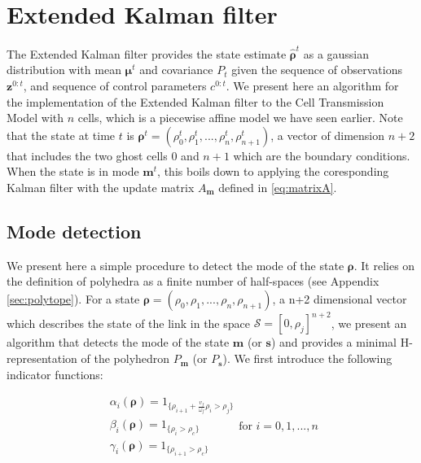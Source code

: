 \documentclass[11pt]{article}
\numberwithin{equation}{section}
\numberwithin{figure}{section}
\numberwithin{table}{section}
\begin{document}
\section{Extended Kalman filter}

The Extended Kalman filter provides the state estimate $\hat{\boldsymbol\rho}^{t}$ as a gaussian distribution with mean $\boldsymbol\mu^{t}$ and covariance $P_{t}$ given the sequence of observations $\boldsymbol z^{0:t}$, and sequence of control parameters $c^{0:t}$. We present here an algorithm for the implementation of the Extended Kalman filter to the Cell Transmission Model with $n$ cells, which is a piecewise affine model we have seen earlier. Note that the state at time $t$ is $\boldsymbol\rho^{t} = (\rho^{t}_{0},\rho^{t}_{1},...,\rho^{t}_{n},\rho^{t}_{n+1})$, a vector of dimension $n+2$ that includes the two ghost cells $0$ and $n+1$ which are the boundary conditions. When the state is in mode $\boldsymbol m^{t}$, this boils down to applying the coresponding Kalman filter with the update matrix $A_{\boldsymbol m}$ defined in \ref{eq:matrixA}.


\subsection{Mode detection}

We present here a simple procedure to detect the mode of the state $\boldsymbol\rho$. It relies on the definition of polyhedra as a finite number of half-spaces (see Appendix \ref{sec:polytope}). For a state $\boldsymbol\rho = (\rho_{0},\rho_{1},...,\rho_{n},\rho_{n+1})$, a n+2 dimensional vector which describes the state of the link in the space $\mathcal{S} = [0,\rho_{j}]^{n+2}$, we present an algorithm that detects the mode of the state $\boldsymbol m$ (or $\boldsymbol s$) and provides a minimal H-representation of the polyhedron $P_{\boldsymbol m}$ (or $P_{\boldsymbol s}$). We first introduce the following indicator functions:

\begin{equation}
\begin{array}{l}
\alpha_{i}(\boldsymbol\rho)=1_{\{\rho_{i+1} + \frac{v_{f}}{\omega_{f}}\rho_{i}>\rho_{j}\}}\\
\beta_{i}(\boldsymbol\rho)=1_{\{\rho_{i}>\rho_{c}\}}\\
\gamma_{i}(\boldsymbol\rho)=1_{\{\rho_{i+1}>\rho_{c}\}}
\end{array}
\text{for }i=0,1,...,n
\label{eq:indicators}
\end{equation}
\end{document}
